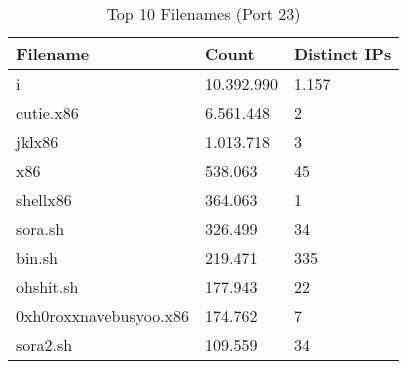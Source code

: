 \begin{table}
\caption{Top 10 Filenames (Port 23)}
\label{tab:top10_filenames_23}
\begin{tabular}{lll}
\toprule
Filename & Count & Distinct IPs \\
\midrule
i & 10.392.990 & 1.157 \\
cutie.x86 & 6.561.448 & 2 \\
jklx86 & 1.013.718 & 3 \\
x86 & 538.063 & 45 \\
shellx86 & 364.063 & 1 \\
sora.sh & 326.499 & 34 \\
bin.sh & 219.471 & 335 \\
ohshit.sh & 177.943 & 22 \\
0xh0roxxnavebusyoo.x86 & 174.762 & 7 \\
sora2.sh & 109.559 & 34 \\
\bottomrule
\end{tabular}
\end{table}
